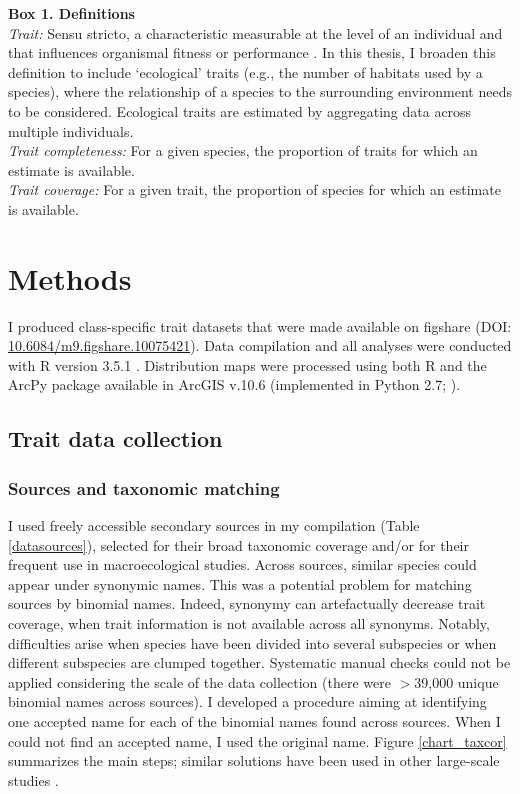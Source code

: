 \begin{mdframed}
\label{Trait_definition_box}
\textbf{Box 1. Definitions}\\
\textit{Trait:} Sensu stricto, a characteristic measurable at the level of an individual and that influences organismal fitness or performance \citep{Violle2007}. In this thesis, I broaden this definition to include `ecological' traits (e.g., the number of habitats used by a species), where the relationship of a species to the surrounding environment needs to be considered. Ecological traits are estimated by aggregating data across multiple individuals.\\
\textit{Trait completeness:} For a given species, the proportion of traits for which an estimate is available.\\
\textit{Trait coverage:} For a given trait, the proportion of species for which an estimate is available.
\end{mdframed}


\section{Methods}

I produced class-specific trait datasets that were made available on figshare (DOI: \url{10.6084/m9.figshare.10075421}).
Data compilation and all analyses were conducted with R version 3.5.1 \citep{R_citation}.
Distribution maps were processed using both R and the ArcPy package available in ArcGIS v.10.6 \citep{ESRI} (implemented in Python 2.7; \citet{Python_citation}).

\subsection{Trait data collection}

\subsubsection{Sources and taxonomic matching}

I used freely accessible secondary sources in my compilation (Table \ref{datasources}), selected for their broad taxonomic coverage and/or for their frequent use in macroecological studies. Across sources, similar species could appear under synonymic names. This was a potential problem for matching sources by binomial names. Indeed, synonymy can artefactually decrease trait coverage, when trait information is not available across all synonyms. Notably, difficulties arise when species have been divided into several subspecies or when different subspecies are clumped together. Systematic manual checks could not be applied considering the scale of the data collection (there were $>$39,000 unique binomial names across sources). I developed a procedure aiming at identifying one accepted name for each of the binomial names found across sources. When I could not find an accepted name, I used the original name. Figure \ref{chart_taxcor} summarizes the main steps; similar solutions have been used in other large-scale studies \citep{Cooke2019b}.

